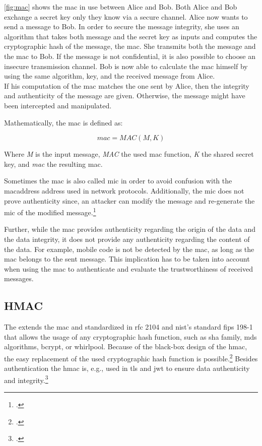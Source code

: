\autoref{fig:mac} shows the \gls{mac} in use between Alice and Bob. Both Alice and Bob exchange a secret key only they know via a secure channel. Alice now wants to send a message to Bob. In order to secure the message integrity, she uses an algorithm that takes both message and the secret key as inputs and computes the cryptographic hash of the message, the \gls{mac}. She transmits both the message and the \gls{mac} to Bob. If the message is not confidential, it is also possible to choose an insecure transmission channel. Bob is now able to calculate the \gls{mac} himself by using the same algorithm, key, and the received message from Alice.\\
If his computation of the \gls{mac} matches the one sent by Alice, then the integrity and authenticity of the message are given. Otherwise, the message might have been intercepted and manipulated.

Mathematically, the \gls{mac} is defined as:

\begin{equation*}
	mac = MAC(M, K)
\end{equation*}

Where \textit{M} is the input message, \textit{MAC} the used \gls{mac} function, \textit{K} the shared secret key, and \textit{mac} the resulting \glsdesc{mac}.

Sometimes the \gls{mac} is also called \gls{mic} in order to avoid confusion with the \gls{macaddress} address used in network protocols. Additionally, the \gls{mic} does not prove authenticity since, an attacker can modify the message and re-generate the \gls{mic} of the modified message.\footcites[See][60--62]{265831}

Further, while the \gls{mac} provides authenticity regarding the origin of the data and the data integrity, it does not provide any authenticity regarding the content of the data. For example, mobile code is not be detected by the \gls{mac}, as long as the \gls{mac} belongs to the sent message. This implication has to be taken into account when using the \gls{mac} to authenticate and evaluate the trustworthiness of received messages.

\subsection{HMAC}

The  extends the \gls{mac} and standardized in \gls{rfc} 2104 and \gls{nist}'s standard \gls{fips} 198-1 that allows the usage of any cryptographic hash function, such as \gls{sha} family, \glspl{md} algorithms, bcrypt, or whirlpool. Because of the black-box design of the \gls{hmac}, the easy replacement of the used cryptographic hash function is possible.\footcites[See][]{krawczyk1997rfc}[See][]{FIPS198} Besides authentication the \gls{hmac} is, e.g., used in \gls{tls} and \gls{jwt} to ensure data authenticity and integrity.\footcites[See][14]{rfc5246}[See][8]{rfc7519}[See][3--4]{s2011rfc}


